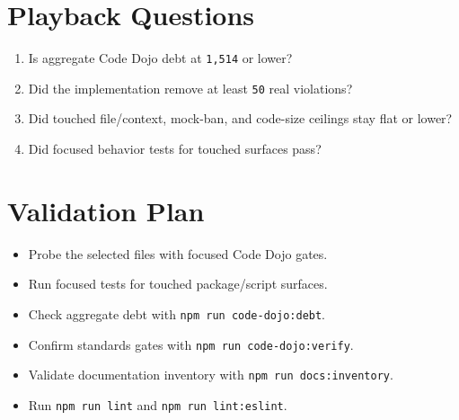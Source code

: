 \section{Playback Questions}\label{record-226-playback-questions}

\begin{enumerate}
\def\labelenumi{\arabic{enumi}.}
\tightlist
\item
  Is aggregate Code Dojo debt at \texttt{1\allowbreak{},\allowbreak{}5\allowbreak{}1\allowbreak{}4} or lower?
\item
  Did the implementation remove at least \texttt{5\allowbreak{}0} real violations?
\item
  Did touched file/context, mock-ban, and code-size ceilings stay flat or lower?
\item
  Did focused behavior tests for touched surfaces pass?
\end{enumerate}

\section{Validation Plan}\label{record-226-validation-plan}

\begin{itemize}
\tightlist
\item
  Probe the selected files with focused Code Dojo gates.
\item
  Run focused tests for touched package/script surfaces.
\item
  Check aggregate debt with \texttt{n\allowbreak{}p\allowbreak{}m\allowbreak{} \allowbreak{}r\allowbreak{}u\allowbreak{}n\allowbreak{} \allowbreak{}c\allowbreak{}o\allowbreak{}d\allowbreak{}e\allowbreak{}-\allowbreak{}d\allowbreak{}o\allowbreak{}j\allowbreak{}o\allowbreak{}:\allowbreak{}d\allowbreak{}e\allowbreak{}b\allowbreak{}t}.
\item
  Confirm standards gates with \texttt{n\allowbreak{}p\allowbreak{}m\allowbreak{} \allowbreak{}r\allowbreak{}u\allowbreak{}n\allowbreak{} \allowbreak{}c\allowbreak{}o\allowbreak{}d\allowbreak{}e\allowbreak{}-\allowbreak{}d\allowbreak{}o\allowbreak{}j\allowbreak{}o\allowbreak{}:\allowbreak{}v\allowbreak{}e\allowbreak{}r\allowbreak{}i\allowbreak{}f\allowbreak{}y}.
\item
  Validate documentation inventory with \texttt{n\allowbreak{}p\allowbreak{}m\allowbreak{} \allowbreak{}r\allowbreak{}u\allowbreak{}n\allowbreak{} \allowbreak{}d\allowbreak{}o\allowbreak{}c\allowbreak{}s\allowbreak{}:\allowbreak{}i\allowbreak{}n\allowbreak{}v\allowbreak{}e\allowbreak{}n\allowbreak{}t\allowbreak{}o\allowbreak{}r\allowbreak{}y}.
\item
  Run \texttt{n\allowbreak{}p\allowbreak{}m\allowbreak{} \allowbreak{}r\allowbreak{}u\allowbreak{}n\allowbreak{} \allowbreak{}l\allowbreak{}i\allowbreak{}n\allowbreak{}t} and \texttt{n\allowbreak{}p\allowbreak{}m\allowbreak{} \allowbreak{}r\allowbreak{}u\allowbreak{}n\allowbreak{} \allowbreak{}l\allowbreak{}i\allowbreak{}n\allowbreak{}t\allowbreak{}:\allowbreak{}e\allowbreak{}s\allowbreak{}l\allowbreak{}i\allowbreak{}n\allowbreak{}t}.
\end{itemize}

